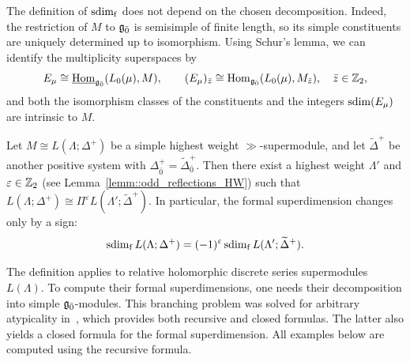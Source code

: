 \begin{remark}
The definition of $\operatorname{sdim}_{\mathrm f}$ does not depend on the chosen decomposition. Indeed, the restriction of $M$ to ${\mathfrak{g}_{\bar{0}}}$ is semisimple of finite length, so its simple constituents are uniquely determined up to isomorphism. Using Schur's lemma, we can identify the multiplicity superspaces by
\begin{equation*}
E_\mu\cong\underline{\operatorname{Hom}}_{{\mathfrak{g}_{\bar{0}}}}(L_0(\mu),M),
\qquad
(E_\mu)_{\bar z}
\cong
\operatorname{Hom}_{{\mathfrak{g}_{\bar{0}}}}(L_0(\mu),M_{\bar z}),
\quad \bar z\in{\mathbb Z}_2,
\end{equation*}
and both the isomorphism classes of the constituents and the integers $\operatorname{sdim}(E_\mu)$ are intrinsic to $M$. 
\end{remark}


\begin{remark}
Let $M\cong L(\Lambda;\Delta^+)$ be a simple highest weight $\gg$-supermodule, and let $\widetilde{\Delta}^+$ be another positive system with $\Delta^{+}_{\bar{0}}=\widetilde{\Delta}_{\bar{0}}^+$. Then there exist a highest weight $\Lambda'$ and $\varepsilon\in {\mathbb Z}_{2}$ (see Lemma~\ref{lemm::odd_reflections_HW}) such that $L(\Lambda;\Delta^+)\cong\Pi^\varepsilon L(\Lambda';\widetilde{\Delta}^+)$. In particular, the formal superdimension changes only by a sign:
\begin{equation*}
\operatorname{sdim}_{\mathrm f} L(\Lambda;\Delta^+)=(-1)^\varepsilon\operatorname{sdim}_{\mathrm f} L(\Lambda';\widetilde{\Delta}^+).
\end{equation*}
\end{remark}


The definition applies to relative holomorphic discrete series supermodules $L(\Lambda)$. To compute their formal superdimensions, one needs their decomposition into simple ${\mathfrak{g}_{\bar{0}}}$-modules. This branching problem was solved for arbitrary atypicality in~\cite{Schmidt_unitary_branching}, which provides both recursive and closed formulas. The latter also yields a closed formula for the formal superdimension. All examples below are computed using the recursive formula.



